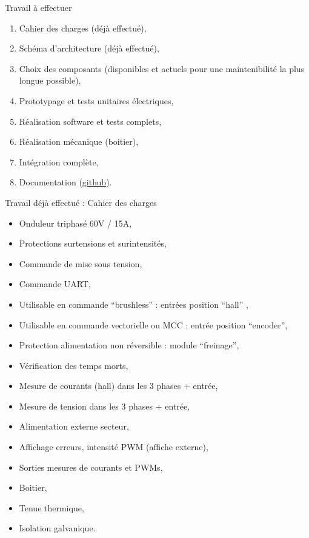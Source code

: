 \documentclass[aspectratio=169]{beamer}
\begin{document}
\begin{frame}{Travail à effectuer}
\begin{enumerate}
	\item Cahier des charges (déjà effectué),
	\item Schéma d'architecture (déjà effectué),
	\item Choix des composants (disponibles et actuels pour une maintenibilité la plus longue possible),
	\item Prototypage et tests unitaires électriques,
	\item Réalisation software et tests complets,
	\item Réalisation mécanique (boitier),
	\item Intégration complète,
	\item Documentation (\href{https://github.com/DBXYD/AAP_ENSEA_Inverter}{github}).
\end{enumerate}
\end{frame}

\begin{frame}{Travail déjà effectué : Cahier des charges}
\begin{itemize}
	\item Onduleur triphasé 60V / 15A,
	\item Protections surtensions et surintensités,
	\item Commande de mise sous tension,
	\item Commande UART,
	\item Utilisable en commande ``brushless'' :  entrées position ``hall'' ,
	\item Utilisable en commande vectorielle ou MCC : entrée position ``encoder'',
	\item Protection alimentation non réversible : module ``freinage'',
	\item Vérification des temps morts,
	\item Mesure de courants (hall) dans les 3 phases + entrée,
	\item Mesure de tension dans les 3 phases + entrée,
	\item Alimentation externe secteur,
	\item Affichage erreurs, intensité PWM (affiche externe),
	\item Sorties mesures de courants et PWMs,
	\item Boitier,
	\item Tenue thermique,
	\item Isolation galvanique.
\end{itemize}
\end{frame}
\end{document}

